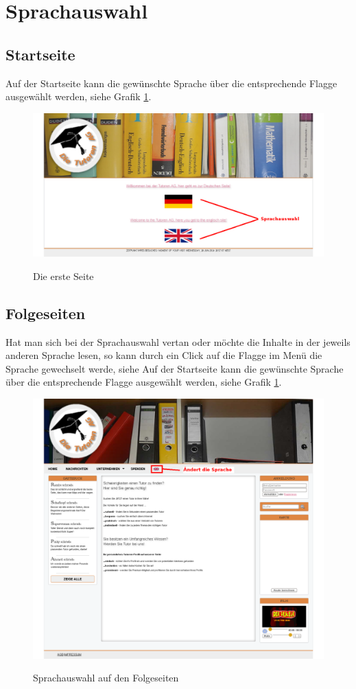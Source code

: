 
\section{Sprachauswahl}

\subsection{Startseite}

Auf der Startseite kann die gewünschte Sprache über die entsprechende Flagge ausgewählt werden, siehe Grafik \ref{fig:startseite}.

\begin{figure}[!htbp]
 \centering
 \includegraphics[width=1\textwidth]{../Screenshots/startseite}
 \label{fig:startseite}
 \caption{Die erste Seite}
\end{figure}

\newpage

\subsection{Folgeseiten}

Hat man sich bei der Sprachauswahl vertan oder möchte die Inhalte in der jeweils anderen Sprache lesen, so kann durch ein Click auf die Flagge im Menü die Sprache gewechselt werde, siehe
Auf der Startseite kann die gewünschte Sprache über die entsprechende Flagge ausgewählt werden, siehe Grafik \ref{fig:startseite}.

\begin{figure}[!htbp]
 \centering
 \includegraphics[width=1\textwidth]{../Screenshots/de/sprachauswahl}
 \label{fig:sprachauswahl}
 \caption{Sprachauswahl auf den Folgeseiten}
\end{figure}
